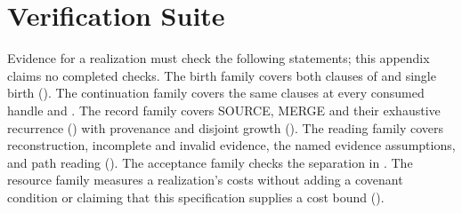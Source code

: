 \documentclass[../main.tex]{subfiles}
\begin{document}
\section{Verification Suite}
\label{app:kpc:verification}
Evidence for a realization must check the following statements; this appendix claims
no completed checks. The birth family covers both clauses of
 and single birth
(). The continuation family covers the
same clauses at every consumed handle and
.
The record family covers SOURCE, MERGE and their exhaustive recurrence
()
with provenance and disjoint growth
().
The reading family covers reconstruction, incomplete and invalid evidence,
the named evidence assumptions, and path reading
().
The acceptance family checks the separation in
.
The resource family measures a realization's costs without adding a
covenant condition or claiming that this specification supplies a cost
bound ().
\end{document}
